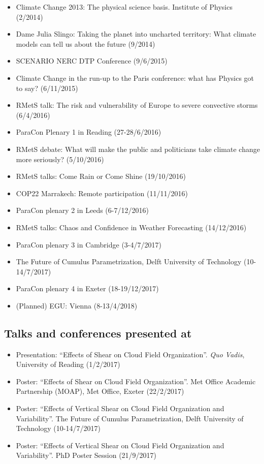 \documentclass[11pt,a4paper]{article}
\begin{document}
\begin{itemize}
  \item Climate Change 2013: The physical science basis. Institute of Physics (2/2014)
  \item Dame Julia Slingo: Taking the planet into uncharted territory: What climate models can tell us about the future (9/2014)
  \item SCENARIO NERC DTP Conference (9/6/2015)
  \item Climate Change in the run-up to the Paris conference: what has Physics got to say? (6/11/2015)
  \item RMetS talk: The risk and vulnerability of Europe to severe convective storms (6/4/2016)
  \item ParaCon Plenary 1 in Reading (27-28/6/2016)
  \item RMetS debate: What will make the public and politicians take climate change more seriously? (5/10/2016)
  \item RMetS talks: Come Rain or Come Shine (19/10/2016)
  \item COP22 Marrakech: Remote participation (11/11/2016)
  \item ParaCon plenary 2 in Leeds (6-7/12/2016)
  \item RMetS talks: Chaos and Confidence in Weather Forecasting (14/12/2016)
  \item ParaCon plenary 3 in Cambridge (3-4/7/2017)
  \item The Future of Cumulus Parametrization, Delft University of Technology (10-14/7/2017)
  \item ParaCon plenary 4 in Exeter (18-19/12/2017)
  \item (Planned) EGU: Vienna (8-13/4/2018)
\end{itemize}

\subsection*{Talks and conferences presented at}

\begin{itemize}
  \item Presentation: ``Effects of Shear on Cloud Field Organization''. \textit{Quo Vadis}, University of Reading (1/2/2017)
  \item Poster: ``Effects of Shear on Cloud Field Organization''. Met Office Academic Partnership (MOAP), Met Office, Exeter (22/2/2017)
  \item Poster: ``Effects of Vertical Shear on Cloud Field Organization and Variability''. The Future of Cumulus Parametrization, Delft University of Technology (10-14/7/2017)
  \item Poster: ``Effects of Vertical Shear on Cloud Field Organization and Variability''. PhD Poster Session (21/9/2017)
\end{itemize}
\end{document}
